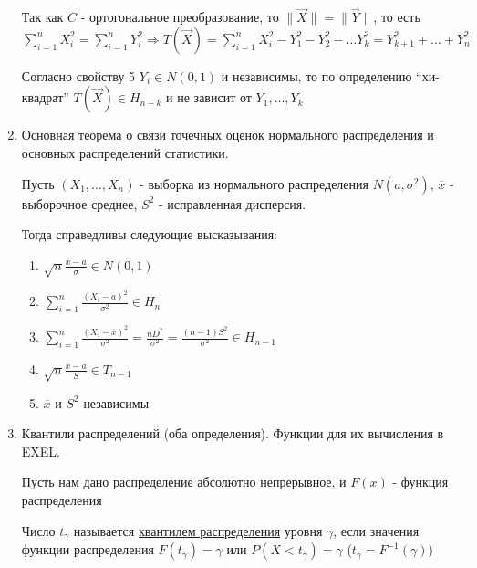 \begin{enumerate}
    \begin{MyProof}
        Так как $C$ - ортогональное преобразование, то $\|\vec X\| = \|\vec Y\|$, то есть $\sum_{i = 1}^n X^2_i = \sum_{i = 1}^n Y^2_i \Longrightarrow
        T(\vec X) = \sum_{i = 1}^n X_i^2 - Y_1^2 - Y_2^2 - \dots Y_k^2 = Y^2_{k + 1} + \dots + Y^2_{n}$

        Согласно свойству 5 $Y_i \in N(0, 1)$ и независимы, то по определению \enquote{хи-квадрат} $T(\vec X) \in H_{n - k}$ и не зависит от $Y_1, \dots, Y_k$
    \end{MyProof}

    \item Основная теорема о связи точечных оценок нормального распределения и основных распределений статистики.

    \begin{MyTheorem}
        \Ths Пусть $(X_1, \dots, X_n)$ - выборка из нормального распределения $N(a, \sigma^2)$, $\overline{x}$ - выборочное среднее, $S^2$ - исправленная дисперсия.

        Тогда справедливы следующие высказывания:

        \begin{enumerate}
            \item $\sqrt{n} \frac{\overline{x} - a}{\sigma} \in N(0, 1)$
            
            \item $\sum_{i = 1}^n \frac{(X_i - a)^2}{\sigma^2} \in H_n$
            
            \item $\sum_{i = 1}^n \frac{(X_i - \overline{x})^2}{\sigma^2} = \frac{n D^*}{\sigma^2} = \frac{(n - 1) S^2}{\sigma^2} \in H_{n - 1}$

            \item $\sqrt{n} \frac{\overline{x} - a}{S} \in T_{n - 1}$
            
            \item $\overline{x}$ и $S^2$ независимы
        \end{enumerate}
    \end{MyTheorem}

    \item Квантили распределений (оба определения). Функции для их вычисления в EXEL.

    Пусть нам дано распределение абсолютно непрерывное, и $F(x)$ - функция распределения

     Число $t_\gamma$ называется \hyperlink{quantile_distribution}{квантилем распределения} уровня $\gamma$, если значения
    функции распределения $F(t_\gamma) = \gamma$ или $P(X < t_\gamma) = \gamma$ ($t_\gamma = F^{-1}(\gamma)$)


\end{enumerate}
